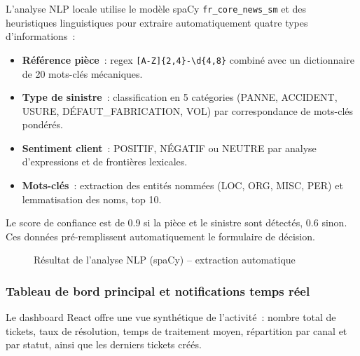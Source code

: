 L'analyse NLP locale utilise le mod\`{e}le spaCy \texttt{fr\_core\_news\_sm} et des heuristiques linguistiques pour extraire automatiquement quatre types d'informations~:

\begin{itemize}
    \item \textbf{R\'{e}f\'{e}rence pi\`{e}ce}~: regex \texttt{[A-Z]\{2,4\}-\textbackslash d\{4,8\}} combin\'{e} avec un dictionnaire de 20 mots-cl\'{e}s m\'{e}caniques.
    \item \textbf{Type de sinistre}~: classification en 5 cat\'{e}gories (PANNE, ACCIDENT, USURE, D\'{E}FAUT\_FABRICATION, VOL) par correspondance de mots-cl\'{e}s pond\'{e}r\'{e}s.
    \item \textbf{Sentiment client}~: POSITIF, N\'{E}GATIF ou NEUTRE par analyse d'expressions et de fronti\`{e}res lexicales.
    \item \textbf{Mots-cl\'{e}s}~: extraction des entit\'{e}s nomm\'{e}es (LOC, ORG, MISC, PER) et lemmatisation des noms, top 10.
\end{itemize}

Le score de confiance est de 0.9 si la pi\`{e}ce et le sinistre sont d\'{e}tect\'{e}s, 0.6 sinon. Ces donn\'{e}es pr\'{e}-remplissent automatiquement le formulaire de d\'{e}cision.

\begin{figure}[H]
    \centering
    \caption{R\'{e}sultat de l'analyse NLP (spaCy) -- extraction automatique}
    \label{fig:nlp}
\end{figure}

\subsubsection{Tableau de bord principal et notifications temps r\'{e}el}

Le dashboard React offre une vue synth\'{e}tique de l'activit\'{e}~: nombre total de tickets, taux de r\'{e}solution, temps de traitement moyen, r\'{e}partition par canal et par statut, ainsi que les derniers tickets cr\'{e}\'{e}s.

